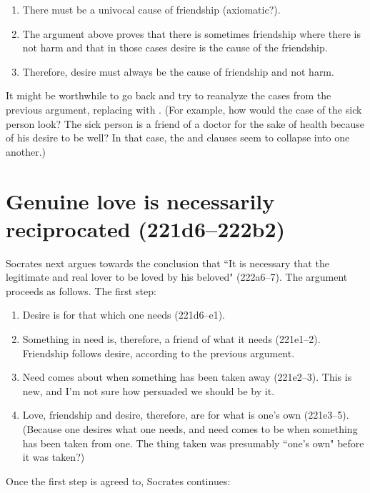 \documentclass[11pt]{article}
\begin{document}
\begin{enumerate}
    \item There must be a univocal cause of friendship (axiomatic?).
    \item The argument above proves that there is sometimes friendship where there is not harm and that in those cases desire is the cause of the friendship.
    \item Therefore, desire must always be the cause of friendship and not harm.
\end{enumerate}

It might be worthwhile to go back and try to reanalyze the cases from the previous argument, replacing  with .  (For example, how would the case of the sick person look?  The sick person is a friend of a doctor for the sake of health because of his desire to be well?  In that case, the  and  clauses seem to collapse into one another.)

\section{Genuine love is necessarily reciprocated (221d6--222b2)}

Socrates next argues towards the conclusion that ``It is necessary that the legitimate and real lover to be loved by his beloved" (222a6--7).  The argument proceeds as follows.  The first step:

\begin{enumerate}
    \item Desire is for that which one needs (221d6--e1).
    \item Something in need is, therefore, a friend of what it needs (221e1--2).  Friendship follows desire, according to the previous argument.
    \item Need comes about when something has been taken away (221e2--3).  This is new, and I'm not sure how persuaded we should be by it.
    \item Love, friendship and desire, therefore, are for what is one's own (221e3--5).  (Because one desires what one needs, and need comes to be when something has been taken from one.  The thing taken was presumably ``one's own" before it was taken?)
\end{enumerate}

Once the first step is agreed to, Socrates continues:
\end{document}
